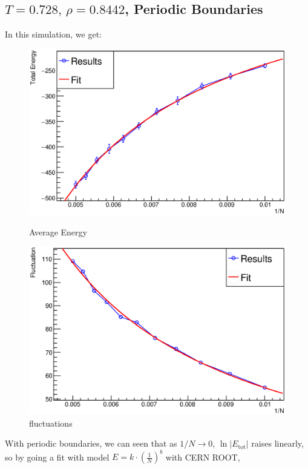 \documentclass[UTF8,a4paper]{article}
\begin{document}
\subsection{$T =0.728,\, \rho = 0.8442$, Periodic Boundaries}
In this simulation, we get:
\begin{figure}[H]
	\centering
	\begin{minipage}[t]{0.45\textwidth}
		\centering
		\includegraphics[height=0.2\textheight]{Root Fit/fit_exp1_p.eps}
		\caption{Average Energy}
	\end{minipage}\hspace{0.5cm}
	\begin{minipage}[t]{0.45\textwidth}
		\centering
		\includegraphics[height=0.2\textheight]{Root Fit/fit_exp1_flu.eps}
		\caption{fluctuations}
	\end{minipage}
\end{figure}
With periodic boundaries, we can seen that as $1/N\to 0$, $\ln \left| E_\text{tot} \right|$ raises linearly, so by going a fit with model $E = k\cdot \left(\frac{1}{N}\right)^{b}$ with CERN ROOT,
\end{document}
